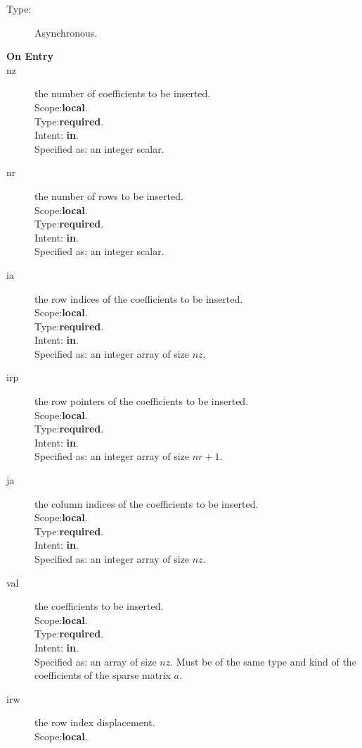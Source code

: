 \begin{description}
\item[Type:] Asynchronous.
\item[\bf On Entry]
\item[nz] the number of coefficients to be inserted.\\
Scope:{\bf local}.\\
Type:{\bf required}.\\
Intent: {\bf in}.\\
Specified as: an integer scalar.
\item[nr] the number of rows to be inserted.\\
Scope:{\bf local}.\\
Type:{\bf required}.\\
Intent: {\bf in}.\\
Specified as: an integer scalar.
\item[ia] the row indices of the coefficients to be inserted.\\
Scope:{\bf local}.\\
Type:{\bf required}.\\
Intent: {\bf in}.\\
Specified as: an integer array of size $nz$.
\item[irp] the row pointers of the coefficients to be inserted.\\
Scope:{\bf local}.\\
Type:{\bf required}.\\
Intent: {\bf in}.\\
Specified as: an integer array of size $nr+1$.
\item[ja] the column indices of the coefficients to be inserted.\\
Scope:{\bf local}.\\
Type:{\bf required}.\\
Intent: {\bf in}.\\
Specified as: an integer array of size $nz$.
\item[val] the coefficients to be inserted.\\
Scope:{\bf local}.\\
Type:{\bf required}.\\
Intent: {\bf in}.\\
Specified as: an array of size $nz$. Must be of the same type and kind
of the coefficients  of the sparse matrix $a$.
\item[irw] the row index displacement.\\
Scope:{\bf local}.\\

\end{description}

